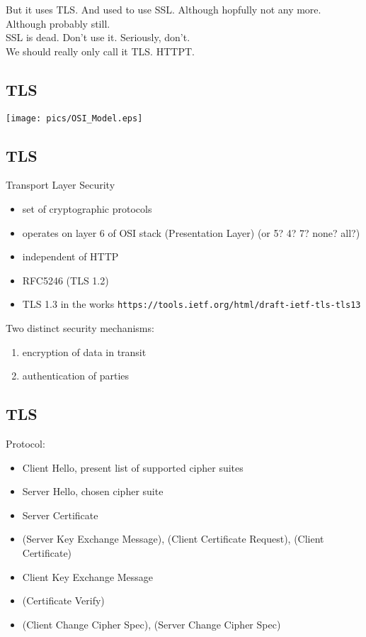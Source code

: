 \documentclass[xga]{xdvislides}
\begin{document}
But it uses TLS.  And used to use SSL. Although
hopfully not any more.  Although probably still. \\

SSL is dead.  Don't use it.  Seriously, don't. \\

We should really only call it TLS.  HTTPT.

\subsection{TLS}
\begin{center}
	\texttt{[image: pics/OSI\_Model.eps]}
\end{center}

\subsection{TLS}
Transport Layer Security
\begin{itemize}
	\item set of cryptographic protocols
	\item operates on layer 6 of OSI stack (Presentation Layer) (or 5? 4? 7? none? all?)
	\item independent of HTTP
	\item RFC5246 (TLS 1.2)
	\item TLS 1.3 in the works {\tt https://tools.ietf.org/html/draft-ietf-tls-tls13}
\end{itemize}
\addvspace{.5in}
Two distinct security mechanisms:
\begin{enumerate}
	\item encryption of data in transit
	\item authentication of parties
\end{enumerate}

\subsection{TLS}
Protocol:
\begin{itemize}
	\item Client Hello, present list of supported cipher suites
	\item Server Hello, chosen cipher suite
	\item Server Certificate
	\item (Server Key Exchange Message), (Client Certificate Request), (Client Certificate)
	\item Client Key Exchange Message
	\item (Certificate Verify)
	\item (Client Change Cipher Spec), (Server Change Cipher Spec)
\end{itemize}
\end{document}
